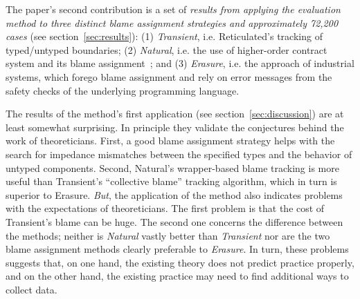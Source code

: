 
The paper's second contribution is a set of {\em results from applying the
evaluation method to three distinct blame assignment strategies and
approximately 72,200 cases\/} (see section~\ref{sec:results}): (1) {\it
Transient\/}, i.e. Reticulated's tracking of typed/untyped boundaries; (2) {\it
Natural\/}, i.e. the use of higher-order contract system and its blame
assignment~\cite{ff-icfp-2002}; and (3) {\it Erasure\/}, i.e. the approach of
industrial systems, which forego blame assignment and rely on error messages
from the safety checks of the underlying programming language.

The results of the method's first application (see section~\ref{sec:discussion})
are at least somewhat surprising. In principle they validate the conjectures
behind the work of theoreticians. First, a good blame assignment strategy helps
with the search for impedance mismatches between the specified types and the
behavior of untyped components.  Second, Natural's wrapper-based blame tracking
is more useful than Transient's ``collective blame'' tracking algorithm, which
in turn is superior to Erasure. {\em But\/}, the application of the method also
indicates problems with the expectations of theoreticians. The first problem is
that the cost of Transient's blame can be huge. The second one concerns the
difference between the methods; neither is {\it Natural\/} vastly better than
{\it Transient\/} nor are the two blame assignment methods clearly preferable to
{\it Erasure\/}.  In turn, these problems suggests that, on one hand, the
existing theory does not predict practice properly, and on the other hand, the
existing practice may need to find additional ways to collect data. 




